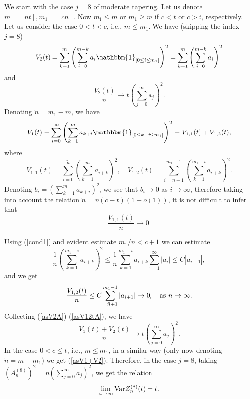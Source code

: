 \documentclass[12pt]{article}
\newcommand{\ind}[1]{\mathbbm{1}_{#1}}
\theoremstyle{plain}
\theoremstyle{definition}
\begin{document}
 We start with the case $j=8$ of moderate tapering. Let us denote $m=[nt], m_1=[cn]$.  Now  $m_1\le m$ or $m_1\ge m$ if $c<t$ or $c>t$, respectively. Let us consider the case $0<t<c$, i.e., $m\le m_1$. We have (skipping the index $j=8$)
$$
V_2(t)=\sum_{k=1}^m \left (\sum_{i=0}^{m-k} a_{i}\ind{[0\le i\le m_1]} \right )^2=\sum_{k=1}^m \left (\sum_{i=0}^{m-k} a_{i}\right )^2
$$
and
\begin{equation}\label{asV2A}
\frac{V_{2}(t)}{n} \to t\left (\sum_{j=0}^\infty a_j \right)^2.
\end{equation}
Denoting ${\tilde n}=m_1-m$, we have
$$
V_1(t)=\sum_{i=0}^\infty \left (\sum_{k=1}^{m} a_{k+i}\ind{[0\le k+i\le m_1]} \right )^2=V_{1,1}(t)+V_{1,2}(t),
$$
where
$$
V_{1,1}(t)=\sum_{i=0}^{{\tilde n}} \left (\sum_{k=1}^{m} a_{i+k} \right )^2, \quad V_{1,2}(t)=\sum_{i={\tilde n}+1}^{m_1-1} \left (\sum_{k=1}^{m_1-i} a_{i+k} \right )^2.
$$
Denoting $b_i=\left (\sum_{k=1}^{m} a_{k+i} \right )^2$, we see that $b_i\to 0$ as $i\to \infty$, therefore
taking into account the relation ${\tilde n}=n(c-t)(1+o(1))$, it is not difficult to infer that
\begin{equation}\label{asV11tA}
\frac{V_{1,1}(t)}{n} \to 0.
\end{equation}

Using (\ref{cond1}) and evident estimate $m_1/n <c+1$ we can estimate
$$
  \frac{1}{n} \left (\sum_{k=1}^{m_1-i} a_{i+k} \right )^2 \le \frac{1}{n}\sum_{k=1}^{m_1-i} a_{i+k} \sum_{i=1}^{\infty} |a_{i}|\le  C|a_{i+1}|,
$$
and  we get
\begin{equation}\label{asV12tA}
\frac{V_{1,2}(t)}{n}\le C \sum_{={\tilde n}+1}^{m_1-1}|a_{i+1}|\to 0, \quad {\rm as} \ n\to \infty.
\end{equation}
Collecting (\ref{asV2A})-(\ref{asV12tA}), we have
\begin{equation}\label{asV1+V2}
\frac{V_{1}(t)+V_2(t)}{n} \to t\left (\sum_{j=0}^\infty a_j \right)^2.
\end{equation}
In the case $0<c\le t$, i.e., $m \le m_1$, in a similar way (only now denoting ${\tilde n}=m-m_1$) we get (\ref{asV1+V2}). Therefore, in the case $j=8$, taking $\left (A_n^{(8)}\right )^2=n\left (\sum_{j=0}^\infty a_j \right)^2 $, we get the  relation
\begin{equation*}\label{VarZn}
\lim_{n\to \infty}{\rm Var}Z_n^{(8)}(t)=t.
\end{equation*}
\end{document}
